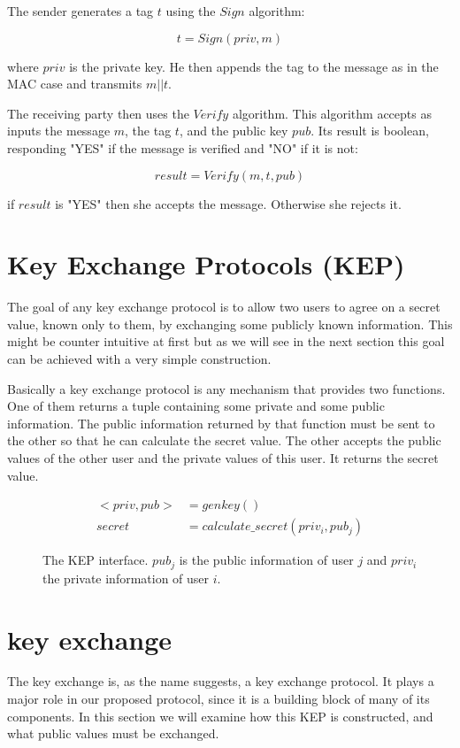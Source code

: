 The sender generates a tag $t$ using the $Sign$ algorithm:

\[
  t = Sign(priv, m)
\]

where $priv$ is the private key.
He then appends the tag to the message as in the MAC case and transmits $m||t$.

The receiving party then uses the $Verify$ algorithm.
This algorithm accepts as inputs the message $m$, the tag $t$, and the public key $pub$.
Its result is boolean, responding "YES" if the message is verified and "NO" if it is not:

\[
  result = Verify(m,t,pub)
\]

if $result$ is "YES" then she accepts the message. Otherwise she rejects it.

\section{Key Exchange Protocols (KEP)}

The goal of any key exchange protocol is to allow two users to agree on a secret value, known only to them, by exchanging some publicly known information.
This might be counter intuitive at first but as we will see in the next section this goal can be achieved with a very simple construction.

Basically a key exchange protocol is any mechanism that provides two functions.
One of them returns a tuple containing some private and some public information.
The public information returned by that function must be sent to the other so that he can calculate the secret value.
The other accepts the public values of the other user and the private values of this user.
It returns the secret value.

\begin{figure}[H]
  \begin{align*}
    <priv, pub> &= genkey() \\
    secret &= calculate\_secret(priv_i, pub_j)
  \end{align*}
  \caption[The interface of a Key Exchange Protocol]{The KEP interface. $pub_j$ is the public information of user $j$ and $priv_i$ the private information of user $i$.}
\end{figure}

\section{\dhname key exchange}

The \dhname key exchange is, as the name suggests, a key exchange protocol.
It plays a major role in our proposed protocol, since it is a building block of many of its components.
In this section we will examine how this KEP is constructed, and what public values must be exchanged.

